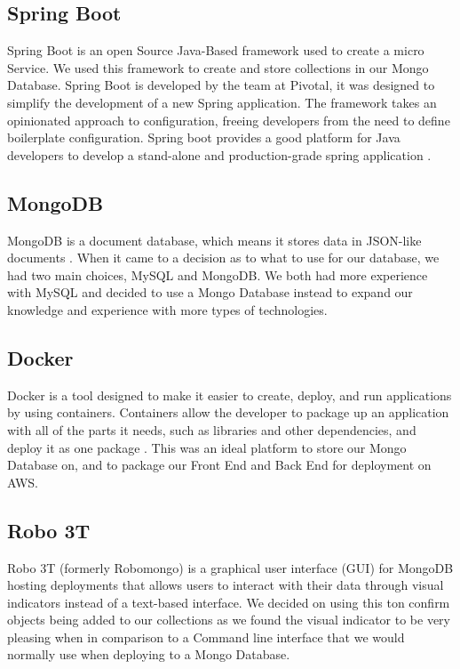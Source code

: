 \subsection{Spring Boot}
Spring Boot is an open Source Java-Based framework used to create a micro Service. We used this framework to create and store collections in our Mongo Database. Spring Boot is developed by the team at Pivotal, it was designed to simplify the development of a new Spring application. The framework takes an opinionated approach to configuration, freeing developers from the need to define boilerplate configuration. Spring boot provides a good platform for Java developers to develop a stand-alone and production-grade spring application \cite{Javapoint}.

\subsection{MongoDB}
MongoDB is a document database, which means it stores data in JSON-like documents \cite{Mongo}. When it came to a decision as to what to use for our database, we had two main choices, MySQL and MongoDB. We both had more experience with MySQL and decided to use a Mongo Database instead to expand our knowledge and experience with more types of technologies.

\subsection{Docker}
Docker is a tool designed to make it easier to create, deploy, and run applications by using containers. Containers allow the developer to package up an application with all of the parts it needs, such as libraries and other dependencies, and deploy it as one package \cite{Docker}. This was an ideal platform to store our Mongo Database on, and to package our Front End and Back End for deployment on AWS.

\subsection{Robo 3T}
Robo 3T (formerly Robomongo) is a graphical user interface (GUI) for MongoDB hosting deployments that allows users to interact with their data through visual indicators instead of a text-based interface. We decided on using this ton confirm objects being added to our collections as we found the visual indicator to be very pleasing when in comparison to a Command line interface that we would normally use when deploying to a Mongo Database.

